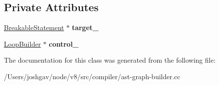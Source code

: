 \subsection*{Private Attributes}
\begin{DoxyCompactItemize}
\item 
\hyperlink{classv8_1_1internal_1_1_breakable_statement}{Breakable\+Statement} $\ast$ {\bfseries target\+\_\+}\hypertarget{classv8_1_1internal_1_1compiler_1_1_ast_graph_builder_1_1_control_scope_for_iteration_abefeda1c2531e938a9fc95665f0b7655}{}\label{classv8_1_1internal_1_1compiler_1_1_ast_graph_builder_1_1_control_scope_for_iteration_abefeda1c2531e938a9fc95665f0b7655}

\item 
\hyperlink{classv8_1_1internal_1_1compiler_1_1_loop_builder}{Loop\+Builder} $\ast$ {\bfseries control\+\_\+}\hypertarget{classv8_1_1internal_1_1compiler_1_1_ast_graph_builder_1_1_control_scope_for_iteration_a6ececce9cd9dc78def77c1b1019b7121}{}\label{classv8_1_1internal_1_1compiler_1_1_ast_graph_builder_1_1_control_scope_for_iteration_a6ececce9cd9dc78def77c1b1019b7121}

\end{DoxyCompactItemize}


The documentation for this class was generated from the following file\+:\begin{DoxyCompactItemize}
\item 
/\+Users/joshgav/node/v8/src/compiler/ast-\/graph-\/builder.\+cc\end{DoxyCompactItemize}
